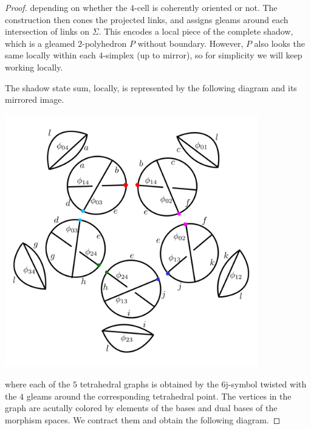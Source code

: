\begin{proof}
  \noindent depending on whether the $4$-cell is coherently
  oriented or not. The construction then cones the projected
  links, and assigns gleams around each intersection of links on
  $\Sigma$. This encodes a local piece of the complete shadow,
  which is a gleamed $2$-polyhedron $P$ without boundary.
  However, $P$ also looks the same locally within each
  $4$-simplex (up to mirror), so for simplicity we will keep
  working locally.

  The shadow state sum, locally, is represented by the following
  diagram and its mirrored image.

  \begin{center}
    \includegraphics[height=11cm]{main-shadow-state-sum-1}
  \end{center}

  \noindent where each of the $5$ tetrahedral graphs is obtained
  by the $6$j-symbol twisted with the $4$ gleams around the
  corresponding tetrahedral point. The vertices in the graph are
  acutally colored by elements of the bases and dual bases of the
  morphism spaces. We contract them and obtain the following
  diagram.


\end{proof}
